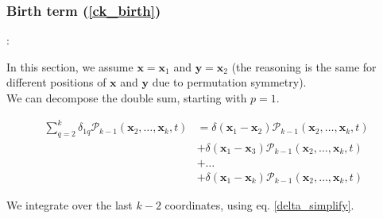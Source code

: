 \subsubsection*{Birth term (\ref{ck_birth})}

:

In this section, we assume $\boldsymbol{x}=\boldsymbol{x}_{1}$ and
$\boldsymbol{y}=\boldsymbol{x}_{2}$ (the reasoning is the same for
different positions of $\boldsymbol{x}$ and $\boldsymbol{y}$ due
to permutation symmetry). \\

We can decompose the double sum, starting with $p=1$.

\begin{subequations} 
\begin{align}
\sum_{q=2}^{k}\delta_{1q}\mathcal{P}_{k-1}(\boldsymbol{x}_{2},\ldots,\boldsymbol{x}_{k},t) & =\delta(\boldsymbol{x}_{1}-\boldsymbol{x}_{2})\mathcal{P}_{k-1}(\boldsymbol{x}_{2},\ldots,\boldsymbol{x}_{k},t)\\
 & +\delta(\boldsymbol{x}_{1}-\boldsymbol{x}_{3})\mathcal{P}_{k-1}(\boldsymbol{x}_{2},\ldots,\boldsymbol{x}_{k},t)\\
 & +\ldots\\
 & +\delta(\boldsymbol{x}_{1}-\boldsymbol{x}_{k})\mathcal{P}_{k-1}(\boldsymbol{x}_{2},\ldots,\boldsymbol{x}_{k},t)
\end{align}
\end{subequations}

We integrate over the last $k-2$ coordinates, using eq. \ref{delta_simplify}.

